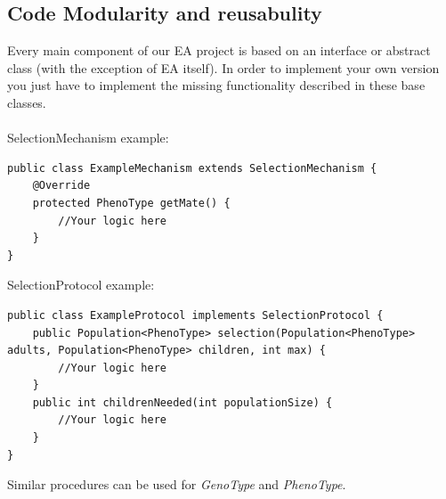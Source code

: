 \subsection{Code Modularity and reusabulity}
	Every main component of our EA project is based on an interface or abstract class (with the exception of EA itself). In order to implement your own version you just have to implement the missing functionality described in these base classes.\\\\
SelectionMechanism example:
	\begin{verbatim}
public class ExampleMechanism extends SelectionMechanism {
    @Override
    protected PhenoType getMate() {
        //Your logic here
    }
}
	\end{verbatim}
	SelectionProtocol example:
	\begin{verbatim}
public class ExampleProtocol implements SelectionProtocol {
    public Population<PhenoType> selection(Population<PhenoType> adults, Population<PhenoType> children, int max) {
        //Your logic here
    }
    public int childrenNeeded(int populationSize) {
        //Your logic here
    }
}
	\end{verbatim}
	Similar procedures can be used for \textit{GenoType} and \textit{PhenoType}.
